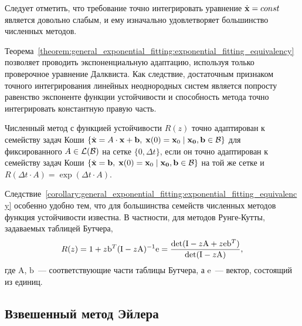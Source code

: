 Следует отметить, что требование точно интегрировать уравнение $ \dot{\mathbf{x}} = const $
является довольно слабым, и ему изначально удовлетворяет большинство численных методов.

Теорема~\ref{theorem:general_exponential_fitting:exponential_fitting_equivalency}
позволяет проводить экспоненциальную адаптацию,
используя только проверочное уравнение Далквиста.
Как следствие, достаточным признаком точного интегрирования линейных неоднородных систем
является попросту равенство экспоненте функции устойчивости
и способность метода точно интегрировать константную правую часть.

\begin{corollary}
    \label{corollary:general_exponential_fitting:exponential_fitting_equivalency}
    Численный метод с функцией устойчивости $ R(z) $ точно адаптирован к семейству задач Коши
    $ \{ \dot{\mathbf{x}} = A \cdot \mathbf{x} + \mathbf{b}, \; \mathbf{x}(0) = \mathbf{x}_0 \mid \mathbf{x_0}, \mathbf{b} \in \mathcal{B} \} $
    для фиксированного $ A \in \mathcal{L}(\mathcal{B}) $ на сетке $ \{ 0, \Delta t \} $,
    если он точно адаптирован к семейству задач Коши
    $ \{ \dot{\mathbf{x}} = \mathbf{b}, \; \mathbf{x}(0) = \mathbf{x}_0 \mid \mathbf{x_0}, \mathbf{b} \in \mathcal{B} \} $
    на той же сетке и $ R(\Delta t \cdot A) = \exp(\Delta t \cdot A) $.
\end{corollary}

Следствие~\ref{corollary:general_exponential_fitting:exponential_fitting_equivalency}
особенно удобно тем, что для большинства семейств численных методов функция устойчивости известна.
В частности, для методов Рунге-Кутты, задаваемых таблицей Бутчера,
%
\begin{equation}
    \label{eq:general_exponential_fitting:runge-kutta}
    R(z) = 1 + z \mathrm{b}^T (\mathrm{I} - z \mathrm{A})^{-1} \mathrm{e} =
    \frac{\det (\mathrm{I} - z \mathrm{A} + z \mathrm{e} \mathrm{b}^T)}{\det(\mathrm{I} - z \mathrm{A})},
\end{equation}
%
где $ \mathrm{A} $, $ \mathrm{b} $~--- соответствующие части таблицы Бутчера,
а $ \mathrm{e} $~--- вектор, состоящий из единиц.


\subsection{Взвешенный метод Эйлера}
\label{subsection:exponential_fitting:weighted_Euler}

